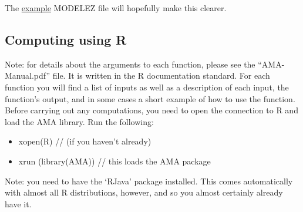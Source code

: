 \documentclass[12pt]{article}
\begin{document}
The \hyperlink{exmpl}{example} MODELEZ file will hopefully make this clearer. \\

\subsection{Computing using R}
Note: for details about the arguments to each function, please see the ``AMA-Manual.pdf'' file.  It is written in the R documentation standard.  For each function you will find a list of inputs as well as a description of each input, the function's output, and in some cases a short example of how to use the function. \\

Before carrying out any computations, you need to open the connection to R and load the AMA library.  Run the following: \begin{itemize}
\item xopen(R) // (if you haven't already)
\item xrun (library(AMA)) // this loads the AMA package
\end{itemize}
Note: you need to have the `RJava' package installed. This comes automatically with almost all R distributions, however, and so you almost certainly already have it.
\end{document}
